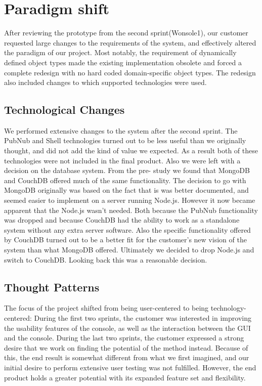 \section{Paradigm shift}
After reviewing the prototype from the second sprint(Wonsole1), our customer requested large changes to the requirements of the system, and effectively altered the paradigm of our project. Most notably, the requirement of dynamically defined object types made the existing implementation obsolete and forced a complete redesign with no hard coded domain-specific object types. The redesign also included changes to which supported technologies were used.

\subsection{Technological Changes}
We performed extensive changes to the system after the second sprint. The PubNub and Shell technologies turned out to be less useful than we originally thought, and did not add the kind of value we expected. As a result both of these technologies were not included in the final product. Also we were left with a decision on the database system. From the pre- study we found that MongoDB and CouchDB offered much of the same functionality. The decision to go with MongoDB originally was based on the fact that is was better documented, and seemed easier to implement on a server running Node.js. However it now became apparent that the Node.js wasn't needed. Both because the PubNub functionality was dropped and because CouchDB had the ability to work as a standalone system without any extra server software. Also the specific functionality offered by CouchDB turned out to be a better fit for the customer's new vision of the system than what MongoDB offered. Ultimately we decided to drop Node.js and switch to CouchDB. Looking back this was a reasonable decision.

\subsection{Thought Patterns}
The focus of the project shifted from being user-centered to being technology-centered: During the first two sprints, the customer was interested in improving the usability features of the console, as well as the interaction between the GUI and the console. During the last two sprints, the customer expressed a strong desire that we work on finding the potential of the method instead. Because of this, the end result is somewhat different from what we first imagined, and our initial desire to perform extensive user testing was not fulfilled. However, the end product holds a greater potential with its expanded feature set and flexibility.

